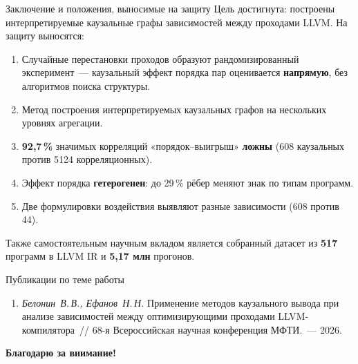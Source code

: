 \documentclass[aspectratio=43]{beamer}
\begin{document}
\begin{frame}{Заключение и положения, выносимые на защиту}
  \small
  Цель достигнута: построены интерпретируемые каузальные графы зависимостей
  между проходами LLVM. На защиту выносятся:
  \begin{enumerate}\setlength{\itemsep}{0pt}\setlength{\parskip}{0pt}
    \item Случайные перестановки проходов образуют рандомизированный эксперимент~---
      каузальный эффект порядка пар оценивается \textbf{напрямую}, без алгоритмов
      поиска структуры.
    \item Метод построения интерпретируемых каузальных графов на нескольких
      уровнях агрегации.
    \item \textbf{92,7\,\%} значимых корреляций «порядок--выигрыш» \textbf{ложны}
      (608 каузальных против 5124 корреляционных).
    \item Эффект порядка \textbf{гетерогенен}: до 29\,\% рёбер меняют знак по типам
      программ.
    \item Две формулировки воздействия выявляют разные зависимости (608 против 44).
  \end{enumerate}

  \smallskip
  Также самостоятельным научным вкладом является собранный датасет из
  \textbf{517} программ в LLVM IR и \textbf{5,17 млн} прогонов.
\end{frame}

\begin{frame}{Публикации по теме работы}
  \begin{enumerate}
    \item \emph{Белонин~В.\,В., Ефанов~Н.\,Н.} Применение методов каузального
      вывода при анализе зависимостей между оптимизирующими проходами
      LLVM-компилятора~// 68-я Всероссийская научная конференция МФТИ.~--- 2026.
  \end{enumerate}

  \vfill
  \begin{center}
    {\color{titlered}\bfseries\Large Благодарю за внимание!}
  \end{center}
  \vfill
\end{frame}
\end{document}
